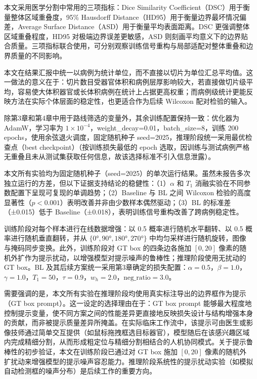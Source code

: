 本文采用医学分割中常用的三项指标\cite{taha2015metrics}：Dice Similarity Coefficient（DSC）用于衡量整体区域重叠度，95\% Hausdorff Distance（HD95）用于衡量边界最坏情况偏差，Average Surface Distance（ASD）用于衡量平均表面距离。DSC 更强调整体区域重叠程度，HD95 对极端边界误差更敏感，ASD 则刻画平均意义下的边界贴合质量。三项指标联合使用，可分别观察训练信号重构与局部适配对整体重叠和边界质量的不同影响。

本文在结果汇报中统一以病例为统计单位，而不直接以切片为单位汇总平均值。这一做法的意义在于：切片数目受器官体积和病例层厚影响较大，若直接做切片级平均，容易使大体积器官或长体积病例在统计上占据更高权重；而病例级统计更能反映方法在实际个体层面的稳定性，也更适合作为后续 Wilcoxon 配对检验的输入。

除第3章和第4章中用于路线筛选的变量外，其余训练配置保持一致：优化器为 AdamW\cite{loshchilov2019adamw}，学习率为 $1 \times 10^{-4}$，weight\_decay=0.01，batch\_size=8，训练 200 epochs，使用余弦退火调度，固定随机种子 seed=2025，推理阶段统一采用最优检查点（best checkpoint）（按训练损失最低的 epoch 选取，因训练与测试病例严格无重叠且未从测试集获取任何信息，故该选择标准不引入信息泄露）。

本文所有实验均为固定随机种子（seed=2025）的单次运行结果。虽然未报告多次独立运行的方差，但以下证据支持结论的稳健性：（1）$\alpha$ 和 $T_1$ 消融实验在不同参数配置下呈现可复现的单调趋势；（2）Baseline 与 BL 之间 Wilcoxon 检验的高度显著性（$p < 0.001$）表明改善并非由少数样本偶然驱动；（3）BL 的标准差（±0.015）低于 Baseline（±0.018），表明训练信号重构改善了跨病例稳定性。

训练阶段对每个样本进行在线数据增强：以 0.5 概率进行随机水平翻转、以 0.5 概率进行随机垂直翻转，并从 $\{0°, 90°, 180°, 270°\}$ 中均匀采样进行随机旋转，图像与掩码同步变换。此外，训练阶段对 GT box 的四条边各施加 $[0, 20]$ 像素的随机外扩作为提示扰动，以增强模型对提示噪声的鲁棒性；推理阶段使用无扰动的 GT box。BL 及其后续方案统一采用第3章确定的损失配置：$\alpha = 0.5$，$\beta = 1.0$，$\gamma = 1.0$，$T_1 = 50$，$\tau = 0.9$，$w_h = 2.0$，$\text{neg\_ratio}=3.0$。

需要强调的是，本文所有实验在推理阶段均使用真实标注导出的边界框作为提示（GT box prompt）。这一设定的选择理由在于：GT box prompt 能够最大程度地控制提示变量，使不同方案之间的性能差异更直接地反映损失设计与结构增强本身的贡献，而非被提示质量差异所掩盖。在实际临床工作流中，该提示可由医生或影像技师通过简单交互提供（如鼠标拖拽框选目标器官），模型随后在该感兴趣区域内完成精细分割，从而形成粗定位与精细分割相结合的人机协同模式。关于提示鲁棒性的初步验证，本文在训练阶段已通过对 GT box 施加 $[0, 20]$ 像素的随机外扩扰动来增强模型的提示噪声容忍能力。推理阶段系统性的提示扰动实验（如模拟自动检测框的噪声分布）是后续工作的重要方向。

